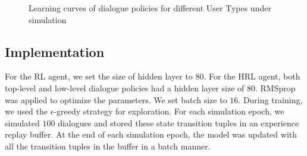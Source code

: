 \documentclass[11pt,letterpaper]{article}
\begin{document}
\begin{figure*}[htb] \centering 
\subfigure[Success Rate of User Type A] { \label{fig:learning_curve_typeA} 
\texttt{[image: figures/learning\_curve\_success\_rate\_typeA.pdf]}}
\subfigure[Success Rate of User Type B] { \label{fig:learning_curve_typeB} 
\texttt{[image: figures/learning\_curve\_success\_rate\_typeB.pdf]}}
\subfigure[Success Rate of User Type C] { \label{fig:learning_curve_typeC} 
\texttt{[image: figures/learning\_curve\_success\_rate\_typeC.pdf]}}
\vspace{-2mm}
\caption{Learning curves of dialogue policies for different User Types under simulation} 
\label{fig:learning_curve} 
\vspace{-3mm}
\end{figure*}


\subsection{Implementation}
For the RL agent, we set the size of hidden layer to $80$. For the HRL agent, both top-level and low-level dialogue policies had a hidden layer size of $80$. RMSprop was applied to optimize the parameters. We set batch size to $16$. During training, we used the $\epsilon$-greedy strategy for exploration. For each simulation epoch, we simulated $100$ dialogues and stored these state transition tuples in an experience replay buffer. At the end of each simulation epoch, the model was updated with all the transition tuples in the buffer in a batch manner.
\end{document}
